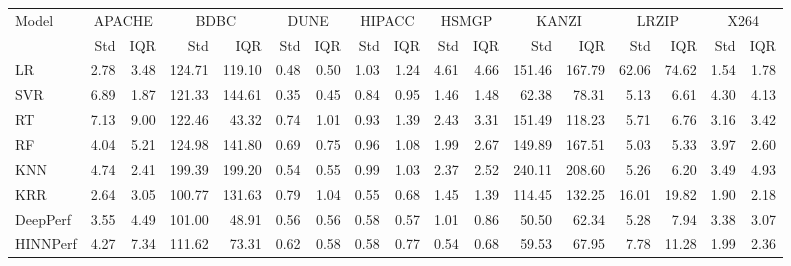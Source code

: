 \begin{tabular}{lrrrrrrrrrrrrrrrr}
\toprule
Model & \multicolumn{2}{c}{APACHE} & \multicolumn{2}{c}{BDBC} & \multicolumn{2}{c}{DUNE} & \multicolumn{2}{c}{HIPACC} & \multicolumn{2}{c}{HSMGP} & \multicolumn{2}{c}{KANZI} & \multicolumn{2}{c}{LRZIP} & \multicolumn{2}{c}{X264} \\
 & Std & IQR & Std & IQR & Std & IQR & Std & IQR & Std & IQR & Std & IQR & Std & IQR & Std & IQR \\
\midrule
LR & 2.78 & 3.48 & 124.71 & 119.10 & 0.48 & 0.50 & 1.03 & 1.24 & 4.61 & 4.66 & 151.46 & 167.79 & 62.06 & 74.62 & 1.54 & 1.78 \\
SVR & 6.89 & 1.87 & 121.33 & 144.61 & 0.35 & 0.45 & 0.84 & 0.95 & 1.46 & 1.48 & 62.38 & 78.31 & 5.13 & 6.61 & 4.30 & 4.13 \\
RT & 7.13 & 9.00 & 122.46 & 43.32 & 0.74 & 1.01 & 0.93 & 1.39 & 2.43 & 3.31 & 151.49 & 118.23 & 5.71 & 6.76 & 3.16 & 3.42 \\
RF & 4.04 & 5.21 & 124.98 & 141.80 & 0.69 & 0.75 & 0.96 & 1.08 & 1.99 & 2.67 & 149.89 & 167.51 & 5.03 & 5.33 & 3.97 & 2.60 \\
KNN & 4.74 & 2.41 & 199.39 & 199.20 & 0.54 & 0.55 & 0.99 & 1.03 & 2.37 & 2.52 & 240.11 & 208.60 & 5.26 & 6.20 & 3.49 & 4.93 \\
KRR & 2.64 & 3.05 & 100.77 & 131.63 & 0.79 & 1.04 & 0.55 & 0.68 & 1.45 & 1.39 & 114.45 & 132.25 & 16.01 & 19.82 & 1.90 & 2.18 \\
DeepPerf & 3.55 & 4.49 & 101.00 & 48.91 & 0.56 & 0.56 & 0.58 & 0.57 & 1.01 & 0.86 & 50.50 & 62.34 & 5.28 & 7.94 & 3.38 & 3.07 \\
HINNPerf & 4.27 & 7.34 & 111.62 & 73.31 & 0.62 & 0.58 & 0.58 & 0.77 & 0.54 & 0.68 & 59.53 & 67.95 & 7.78 & 11.28 & 1.99 & 2.36 \\
\bottomrule
\end{tabular}
